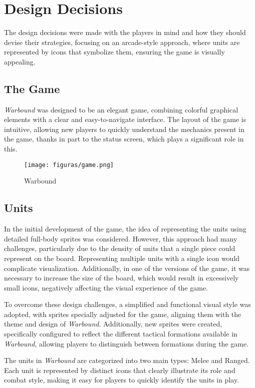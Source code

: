 \section{Design Decisions}
The design decisions were made with the players in mind and how they should devise their strategies, focusing on an arcade-style approach, where units are represented by icons that symbolize them, ensuring the game is visually appealing.

\subsection{The Game}

\textit{Warbound} was designed to be an elegant game, combining colorful graphical elements with a clear and easy-to-navigate interface. The layout of the game is intuitive, allowing new players to quickly understand the mechanics present in the game, thanks in part to the status screen, which plays a significant role in this.

\begin{figure}[H]
    \centering
    \texttt{[image: figuras/game.png]}
    \caption{Warbound}
    \label{fig:game}
\end{figure}

\subsection{Units}

In the initial development of the game, the idea of representing the units using detailed full-body sprites was considered. However, this approach had many challenges, particularly due to the density of units that a single piece could represent on the board. Representing multiple units with a single icon would complicate visualization. Additionally, in one of the versions of the game, it was necessary to increase the size of the board, which would result in excessively small icons, negatively affecting the visual experience of the game.

To overcome these design challenges, a simplified and functional visual style was adopted, with sprites specially adjusted for the game, aligning them with the theme and design of \textit{Warbound}. Additionally, new sprites were created, specifically configured to reflect the different tactical formations available in \textit{Warbound}, allowing players to distinguish between formations during the game.

The units in \textit{Warbound} are categorized into two main types: Melee and Ranged. Each unit is represented by distinct icons that clearly illustrate its role and combat style, making it easy for players to quickly identify the units in play.

